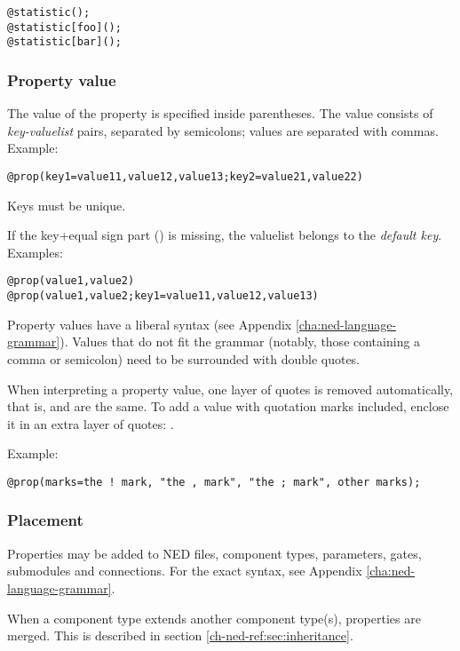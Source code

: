 \begin{verbatim}
@statistic();
@statistic[foo]();
@statistic[bar]();
\end{verbatim}


\subsubsection{Property value}

The value of the property is specified inside parentheses. The value consists of
\textit{key-valuelist} pairs, separated by semicolons; values are separated with commas.
Example:

\begin{verbatim}
@prop(key1=value11,value12,value13;key2=value21,value22)
\end{verbatim}

Keys must be unique.

If the key+equal sign part () is missing, the valuelist belongs
to the \textit{default key}. Examples:

\begin{verbatim}
@prop(value1,value2)
@prop(value1,value2;key1=value11,value12,value13)
\end{verbatim}

Property values have a liberal syntax (see Appendix \ref{cha:ned-language-grammar}).
Values that do not fit the grammar (notably, those containing a comma or
semicolon) need to be surrounded with double quotes.

When interpreting a property value, one layer of quotes is removed
automatically, that is,  and  are the same. To add a
value with quotation marks included, enclose it in an extra layer of
quotes: .

Example:

\begin{verbatim}
@prop(marks=the ! mark, "the , mark", "the ; mark", other marks);
\end{verbatim}


\subsubsection{Placement}

Properties may be added to NED files, component types, parameters,
gates, submodules and connections. For the exact syntax, see
Appendix \ref{cha:ned-language-grammar}.

When a component type extends another component type(s), properties
are merged. This is described in section \ref{ch-ned-ref:sec:inheritance}.


